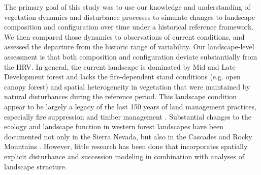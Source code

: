 The primary goal of this study was to use our knowledge and understanding of vegetation dynamics and disturbance processes to simulate changes to landscape composition and configuration over time under a historical reference framework. We then compared those dynamics to observations of current conditions, and assessed the departure from the historic range of variability. Our landscape-level assessment is that both composition and configuration deviate substantially from the HRV. In general, the current landscape is dominated by Mid and Late Development forest and lacks the fire-dependent stand conditions (e.g. open canopy forest) and spatial heterogeneity in vegetation that were maintained by natural disturbances during the reference period. This landscape condition appear to be largely a legacy of the last 150 years of land management practices, especially fire suppression and timber management \citep{Safford2014,Stephens2007}. Substantial changes to the ecology and landscape function in western forest landscapes have been documented not only in the Sierra Nevada, but also in the Cascades and Rocky Mountains \citep{Hessburg2005,Baker2012,Baker2014,Mallek2013,Agee1993} . However, little research has been done that incorporates spatially explicit disturbance and succession modeling in combination with analyses of landscape structure.

